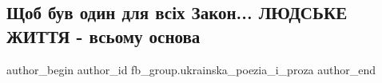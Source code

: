  
 
 
 
 

\subsection{Щоб був один для всіх Закон... ЛЮДСЬКЕ ЖИТТЯ - всьому основа}
\label{sec:14_01_2023.fb.fb_group.ukrainska_poezia_i_proza.2.shchob_buv_odin_dlya}

\ifcmt
 author_begin
   author_id fb_group.ukrainska_poezia_i_proza
 author_end
\fi

